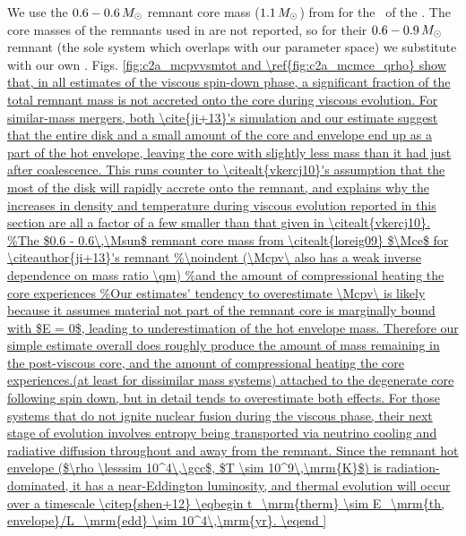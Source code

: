 \noindent We use the $0.6 - 0.6\,\Msun$ remnant core mass ($1.1\,\Msun$) from \citealt{loreig09} for the \Mce\ of the \cite{ji+13}.  The core masses of the remnants used in \cite{schw+12} are not reported, so for their $0.6 - 0.9\,\Msun$ remnant (the sole system which overlaps with our parameter space) we substitute with our own \Mce.  Figs. \ref{fig:c2a_mcpvvsmtot and \ref{fig:c2a_mcmce_qrho} show that, in all estimates of the viscous spin-down phase, a significant fraction of the total remnant mass is not accreted onto the core during viscous evolution.  For similar-mass mergers, both \cite{ji+13}'s simulation and our estimate suggest that the entire disk and a small amount of the core and envelope end up as a part of the hot envelope, leaving the core with slightly less mass than it had just after coalescence.  This runs counter to \citealt{vkercj10}'s assumption that the most of the disk will rapidly accrete onto the remnant, and explains why the increases in density and temperature during viscous evolution reported in this section are all a factor of a few smaller than that given in \citealt{vkercj10}.




For those systems that do not ignite nuclear fusion during the viscous phase, their next stage of evolution involves entropy being transported via neutrino cooling and radiative diffusion throughout and away from the remnant.  Since the remnant hot envelope ($\rho \lesssim 10^4\,\gcc$, $T \sim 10^9\,\mrm{K}$) is radiation-dominated, it has a near-Eddington luminosity, and thermal evolution will occur over a timescale \citep{shen+12}

\eqbegin
t_\mrm{therm} \sim E_\mrm{th, envelope}/L_\mrm{edd} \sim 10^4\,\mrm{yr}.
\eqend

}

